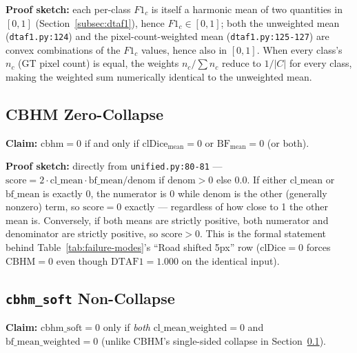 \textbf{Proof sketch:} each per-class $F1_c$ is itself a harmonic mean of two quantities in
$[0,1]$ (Section~\ref{subsec:dtaf1}), hence $F1_c \in [0,1]$; both the unweighted mean
(\texttt{dtaf1.py:124}) and the pixel-count-weighted mean (\texttt{dtaf1.py:125-127}) are convex
combinations of the $F1_c$ values, hence also in $[0,1]$. When every class's $n_c$ (GT pixel
count) is equal, the weights $n_c / \sum n_c$ reduce to $1/|C|$ for every class, making the
weighted sum numerically identical to the unweighted mean.

\subsection{CBHM Zero-Collapse}
\label{app:a3}

\textbf{Claim:} $\mathrm{cbhm}=0$ if and only if $\mathrm{clDice}_{\mathrm{mean}}=0$ or
$\mathrm{BF}_{\mathrm{mean}}=0$ (or both).

\textbf{Proof sketch:} directly from \texttt{unified.py:80-81} --- $\mathrm{score} =
2 \cdot \mathrm{cl\_mean} \cdot \mathrm{bf\_mean} / \mathrm{denom}$ if $\mathrm{denom}>0$ else
$0.0$. If either $\mathrm{cl\_mean}$ or $\mathrm{bf\_mean}$ is exactly 0, the numerator is 0 while
$\mathrm{denom}$ is the other (generally nonzero) term, so $\mathrm{score}=0$ exactly ---
regardless of how close to 1 the other mean is. Conversely, if both means are strictly positive,
both numerator and denominator are strictly positive, so $\mathrm{score}>0$. This is the formal
statement behind Table~\ref{tab:failure-modes}'s ``Road shifted 5px'' row ($\mathrm{clDice}=0$
forces $\mathrm{CBHM}=0$ even though $\mathrm{DTAF1}=1.000$ on the identical input).

\subsection{\texttt{cbhm\_soft} Non-Collapse}
\label{app:a4}

\textbf{Claim:} $\mathrm{cbhm\_soft}=0$ only if \emph{both} $\mathrm{cl\_mean\_weighted}=0$ and
$\mathrm{bf\_mean\_weighted}=0$ (unlike CBHM's single-sided collapse in
Section~\ref{app:a3}).

